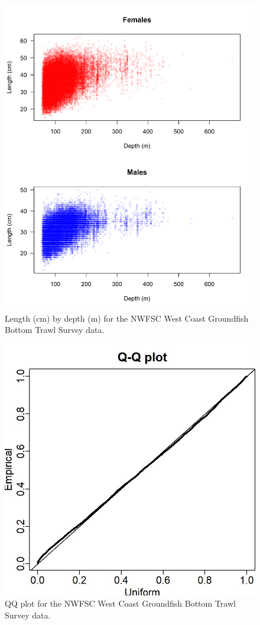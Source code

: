 \documentclass[12pt,]{article}
\begin{document}
\begin{figure}
\centering
\includegraphics{Figures/NWFSC_Size_by_Depth.png}
\caption{Length (cm) by depth (m) for the NWFSC West Coast Groundfish
Bottom Trawl Survey data. \label{fig:nwfsc_size_depth}}
\end{figure}

\FloatBarrier

\begin{figure}
\centering
\includegraphics{Figures/nwfsc_Posterior_Predictive-Histogram-1.jpg}
\caption{QQ plot for the NWFSC West Coast Groundfish Bottom Trawl Survey
data. \label{fig:nw_qq}}
\end{figure}
\end{document}
